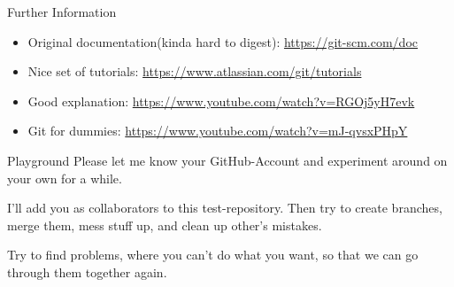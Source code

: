 \documentclass[en]{sdqbeamer}
\begin{document}
\begin{frame}{Further Information}
    \begin{itemize}
        \item Original documentation(kinda hard to digest): \url{https://git-scm.com/doc}
        \item Nice set of tutorials: \url{https://www.atlassian.com/git/tutorials}
        \item Good explanation: \url{https://www.youtube.com/watch?v=RGOj5yH7evk}
        \item Git for dummies: \url{https://www.youtube.com/watch?v=mJ-qvsxPHpY}
    \end{itemize}
\end{frame}

\begin{frame}{Playground}
    Please let me know your GitHub-Account and experiment around on your own for a while.
    \vspace{12pt}
    
    I'll add you as collaborators to this test-repository. Then try to create branches, merge them, mess stuff up, and clean up other's mistakes.
    \vspace{12pt}
    
    Try to find problems, where you can't do what you want, so that we can go through them together again.
\end{frame}
\end{document}
